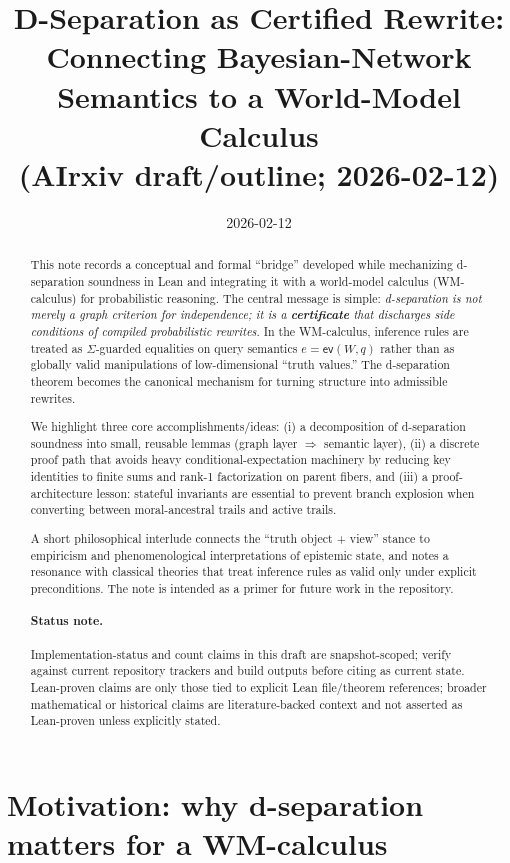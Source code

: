 \documentclass[11pt]{article}
\title{D-Separation as Certified Rewrite:\\
Connecting Bayesian-Network Semantics to a World-Model Calculus\\
\large (AIrxiv draft/outline; 2026-02-12)}
\author{}
\date{2026-02-12}
\newcommand{\side}{\ensuremath{\Sigma}}
\newcommand{\ev}{\mathsf{ev}}
\begin{document}
\maketitle

\begin{abstract}
This note records a conceptual and formal ``bridge'' developed while mechanizing d-separation soundness in Lean
and integrating it with a world-model calculus (WM-calculus) for probabilistic reasoning.
The central message is simple: \emph{d-separation is not merely a graph criterion for independence; it is a
\textbf{certificate} that discharges side conditions of compiled probabilistic rewrites}.
In the WM-calculus, inference rules are treated as \side-guarded equalities on query semantics
$e=\ev(W,q)$ rather than as globally valid manipulations of low-dimensional ``truth values.'' The d-separation theorem
becomes the canonical mechanism for turning structure into admissible rewrites.

We highlight three core accomplishments/ideas:
(i) a decomposition of d-separation soundness into small, reusable lemmas (graph layer $\Rightarrow$ semantic layer),
(ii) a discrete proof path that avoids heavy conditional-expectation machinery by reducing key identities to finite sums
and rank-1 factorization on parent fibers, and (iii) a proof-architecture lesson: stateful invariants are essential to
prevent branch explosion when converting between moral-ancestral trails and active trails.

A short philosophical interlude connects the ``truth object + view'' stance to empiricism and phenomenological
interpretations of epistemic state, and notes a resonance with classical theories that treat inference rules as
valid only under explicit preconditions. The note is intended as a primer for future work in the repository.
\paragraph{Status note.} Implementation-status and count claims in this draft are snapshot-scoped; verify against current repository trackers and build outputs before citing as current state. Lean-proven claims are only those tied to explicit Lean file/theorem references; broader mathematical or historical claims are literature-backed context and not asserted as Lean-proven unless explicitly stated.
\end{abstract}

\tableofcontents

\section{Motivation: why d-separation matters for a WM-calculus}
\end{document}
